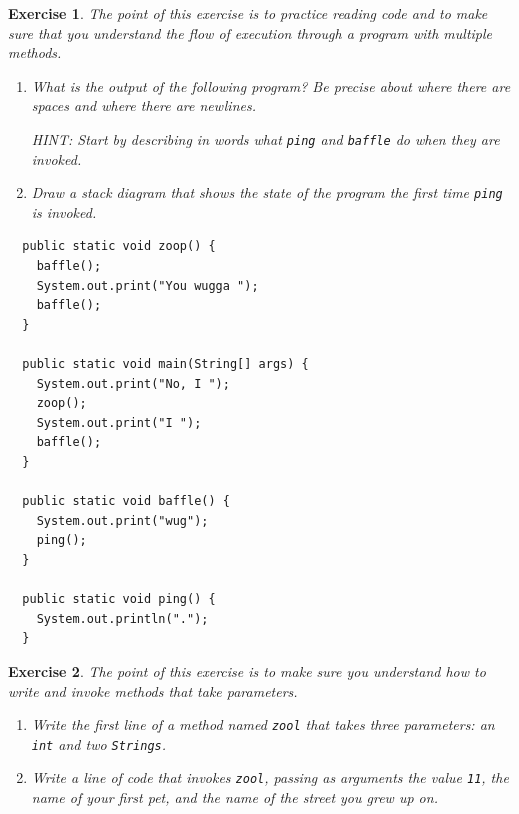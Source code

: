 \documentclass[12pt]{book}
\theoremstyle{exercise}
\newtheorem{exercise}{Exercise}[chapter]
\begin{document}
\begin{exercise}

The point of this exercise is to practice reading code and to
make sure that you understand the flow of execution through
a program with multiple methods.

\begin{enumerate}

\item What is the output of the following program?  Be precise
about where there are spaces and where there are newlines.

HINT: Start by describing in words what {\tt ping} and
{\tt baffle} do when they are invoked.

\item Draw a stack diagram that shows the state of the program
the first time {\tt ping} is invoked.

\end{enumerate}

\begin{lstlisting}
  public static void zoop() {
    baffle();
    System.out.print("You wugga ");
    baffle();
  }

  public static void main(String[] args) {
    System.out.print("No, I ");
    zoop();
    System.out.print("I ");
    baffle();
  }

  public static void baffle() {
    System.out.print("wug");
    ping();
  }

  public static void ping() {
    System.out.println(".");
  }
\end{lstlisting}

\end{exercise}


\begin{exercise}

The point of this exercise is to make sure you understand how
to write and invoke methods that take parameters.

\begin{enumerate}

\item Write the first line of a method named {\tt zool} that
takes three parameters: an {\tt int} and two {\tt Strings}.

\item Write a line of code that invokes {\tt zool}, passing
as arguments the value {\tt 11}, the name of your first pet,
and the name of the street you grew up on.
\end{enumerate}

\end{exercise}
\end{document}
